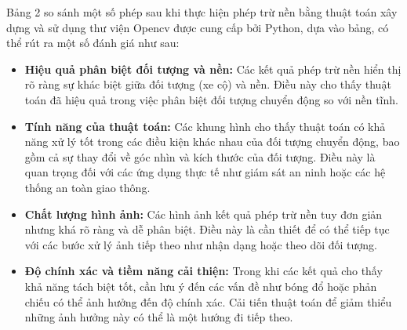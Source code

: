 \documentclass[a4paper]{article}
\begin{document}
Bảng 2 so sánh một số phép sau khi thực hiện phép trừ nền bằng thuật toán xây dựng và sử dụng thư viện Opencv được cung cấp bởi Python, dựa vào bảng, có thể rút ra một số đánh giá như sau:
\begin{itemize}[label={}]
    \item \textbf{Hiệu quả phân biệt đối tượng và nền:} Các kết quả phép trừ nền hiển thị rõ ràng sự khác biệt giữa đối tượng (xe cộ) và nền. Điều này cho thấy thuật toán đã hiệu quả trong việc phân biệt đối tượng chuyển động so với nền tĩnh.
    \item \textbf{Tính năng của thuật toán:} Các khung hình cho thấy thuật toán có khả năng xử lý tốt trong các điều kiện khác nhau của đối tượng chuyển động, bao gồm cả sự thay đổi về góc nhìn và kích thước của đối tượng. Điều này là quan trọng đối với các ứng dụng thực tế như giám sát an ninh hoặc các hệ thống an toàn giao thông.
   \item  \textbf{Chất lượng hình ảnh:} Các hình ảnh kết quả phép trừ nền tuy đơn giản nhưng khá rõ ràng và dễ phân biệt. Điều này là cần thiết để có thể tiếp tục với các bước xử lý ảnh tiếp theo như nhận dạng hoặc theo dõi đối tượng.
   \item \textbf{Độ chính xác và tiềm năng cải thiện:} Trong khi các kết quả cho thấy khả năng tách biệt tốt, cần lưu ý đến các vấn đề như bóng đổ hoặc phản chiếu có thể ảnh hưởng đến độ chính xác. Cải tiến thuật toán để giảm thiểu những ảnh hưởng này có thể là một hướng đi tiếp theo.
   
\end{itemize}
\end{document}
